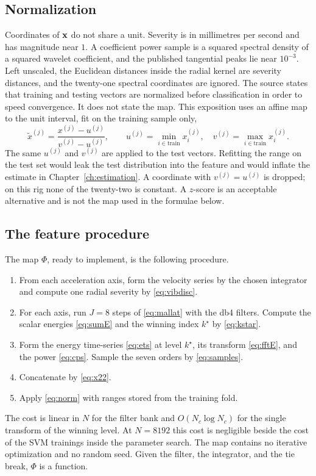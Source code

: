 \subsection{Normalization}

Coordinates of \(\mathbf{x}\) do not share a unit.
Severity is in millimetres per second and has magnitude near \(1\).
A coefficient power sample is a squared spectral density of a squared wavelet coefficient, and the published tangential peaks lie near \(10^{-3}\).
Left unscaled, the Euclidean distances inside the radial kernel are severity distances, and the twenty-one spectral coordinates are ignored.
The source states that training and testing vectors are normalized before classification in order to speed convergence.
It does not state the map.
This exposition uses an affine map to the unit interval, fit on the training sample only,
\begin{equation}
\tilde{x}^{(j)}=\frac{x^{(j)}-u^{(j)}}{v^{(j)}-u^{(j)}},
\qquad
u^{(j)}=\min_{i\in\mathrm{train}} x_{i}^{(j)},
\quad
v^{(j)}=\max_{i\in\mathrm{train}} x_{i}^{(j)}.
\label{eq:norm}
\end{equation}
The same \(u^{(j)}\) and \(v^{(j)}\) are applied to the test vectors.
Refitting the range on the test set would leak the test distribution into the feature and would inflate the estimate in Chapter~\ref{ch:estimation}.
A coordinate with \(v^{(j)}=u^{(j)}\) is dropped; on this rig none of the twenty-two is constant.
A \(z\)-score is an acceptable alternative and is not the map used in the formulae below.

\subsection{The feature procedure}

The map \(\Phi\), ready to implement, is the following procedure.
\begin{enumerate}
\item From each acceleration axis, form the velocity series by the chosen integrator and compute one radial severity by \eqref{eq:vibdisc}.
\item For each axis, run \(J=8\) steps of \eqref{eq:mallat} with the db4 filters.
Compute the scalar energies \eqref{eq:sumE} and the winning index \(k^{\star}\) by \eqref{eq:kstar}.
\item Form the energy time-series \eqref{eq:ets} at level \(k^{\star}\), its transform \eqref{eq:fftE}, and the power \eqref{eq:cps}.
Sample the seven orders by \eqref{eq:samples}.
\item Concatenate by \eqref{eq:x22}.
\item Apply \eqref{eq:norm} with ranges stored from the training fold.
\end{enumerate}
The cost is linear in \(N\) for the filter bank and \(O(N_{c}\log N_{c})\) for the single transform of the winning level.
At \(N=8192\) this cost is negligible beside the cost of the SVM trainings inside the parameter search.
The map contains no iterative optimization and no random seed.
Given the filter, the integrator, and the tie break, \(\Phi\) is a function.

